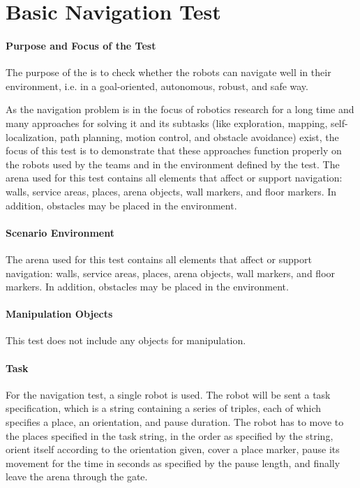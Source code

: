\newpage
\section{Basic Navigation Test}


\paragraph{Purpose and Focus of the Test}
The purpose of the  is to check whether the robots can navigate well in their environment, i.e. in a goal-oriented, autonomous, robust, and safe way.
\par
As the navigation problem is in the focus of robotics research for a long time and many approaches for solving it and its subtasks (like exploration, mapping, self-localization, path planning, motion control, and obstacle avoidance) exist, the focus of this test is to demonstrate that these approaches function properly on the robots used by the teams and in the environment defined by the test.
The arena used for this test contains all elements that affect or support navigation: walls, service areas, places, arena objects, wall markers, and floor markers. In addition, obstacles may be placed in the environment.
\par

\paragraph{Scenario Environment}
The arena used for this test contains all elements that affect or support navigation: walls, service areas, places, arena objects, wall markers, and floor markers. In addition, obstacles may be placed in the environment.

\paragraph{Manipulation Objects}
This test does not include any objects for manipulation.
\paragraph{Task}
For the navigation test, a single robot is used. The robot will be sent a task specification, which is a string containing a series of triples, each of which specifies a place, an orientation, and pause duration. The robot has to move to the places specified in the task string, in the order as specified by the string, orient itself according to the orientation given, cover a place marker, pause its movement for the time in seconds as specified by the pause length, and finally leave the arena through the gate.

